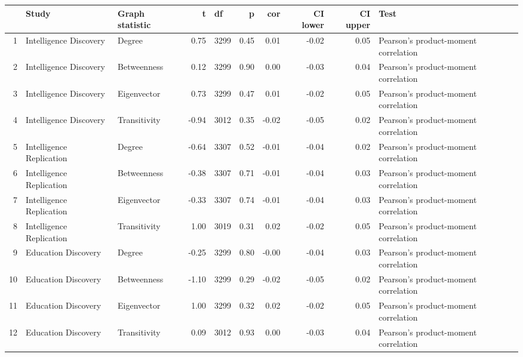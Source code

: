 \begin{table}[ht]
\centering
\begin{adjustbox}{max width=\textwidth}
\begin{tabular}{rllrlrrrrl}
  \hline
 & Study & Graph statistic & t & df & p & cor & CI lower & CI upper & Test \\ 
  \hline
1 & Intelligence Discovery & Degree & 0.75 & 3299 & 0.45 & 0.01 & -0.02 & 0.05 & Pearson's product-moment correlation \\ 
  2 & Intelligence Discovery & Betweenness & 0.12 & 3299 & 0.90 & 0.00 & -0.03 & 0.04 & Pearson's product-moment correlation \\ 
  3 & Intelligence Discovery & Eigenvector & 0.73 & 3299 & 0.47 & 0.01 & -0.02 & 0.05 & Pearson's product-moment correlation \\ 
  4 & Intelligence Discovery & Transitivity & -0.94 & 3012 & 0.35 & -0.02 & -0.05 & 0.02 & Pearson's product-moment correlation \\ 
  5 & Intelligence Replication & Degree & -0.64 & 3307 & 0.52 & -0.01 & -0.04 & 0.02 & Pearson's product-moment correlation \\ 
  6 & Intelligence Replication & Betweenness & -0.38 & 3307 & 0.71 & -0.01 & -0.04 & 0.03 & Pearson's product-moment correlation \\ 
  7 & Intelligence Replication & Eigenvector & -0.33 & 3307 & 0.74 & -0.01 & -0.04 & 0.03 & Pearson's product-moment correlation \\ 
  8 & Intelligence Replication & Transitivity & 1.00 & 3019 & 0.31 & 0.02 & -0.02 & 0.05 & Pearson's product-moment correlation \\ 
  9 & Education Discovery & Degree & -0.25 & 3299 & 0.80 & -0.00 & -0.04 & 0.03 & Pearson's product-moment correlation \\ 
  10 & Education Discovery & Betweenness & -1.10 & 3299 & 0.29 & -0.02 & -0.05 & 0.02 & Pearson's product-moment correlation \\ 
  11 & Education Discovery & Eigenvector & 1.00 & 3299 & 0.32 & 0.02 & -0.02 & 0.05 & Pearson's product-moment correlation \\ 
  12 & Education Discovery & Transitivity & 0.09 & 3012 & 0.93 & 0.00 & -0.03 & 0.04 & Pearson's product-moment correlation \\ 

\end{tabular}
\end{adjustbox}
\end{table}
